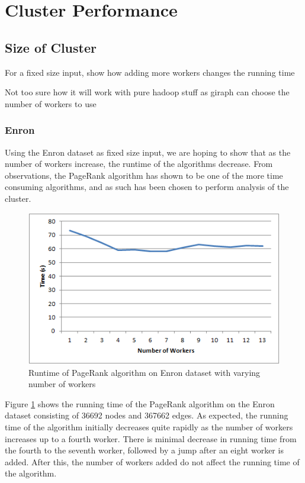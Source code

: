 \section{Cluster Performance}


\subsection{Size of Cluster}
For a fixed size input, show how adding more workers changes the running time

Not too sure how it will work with pure hadoop stuff as giraph can choose the number of workers to use

\subsubsection{Enron}
Using the Enron dataset as fixed size input, we are hoping to show that as the number of workers increase, the runtime of the algorithms decrease. From observations, the PageRank algorithm has shown to be one of the more time consuming algorithms, and as such has been chosen to perform analysis of the cluster.

\begin{figure}[htbp]%
\centering
\includegraphics[]{./img/pagerank-enron-benchmark}%
\caption{Runtime of PageRank algorithm on Enron dataset with varying number of workers}%
\label{fig:enronbenchmark}%
\end{figure}

Figure \ref{fig:enronbenchmark} shows the running time of the PageRank algorithm on the Enron dataset consisting of 36692 nodes and 367662 edges. As expected, the running time of the algorithm initially decreases quite rapidly as the number of workers increases up to a fourth worker. There is minimal decrease in running time from the fourth to the seventh worker, followed by a jump after an eight worker is added. After this, the number of workers added do not affect the running time of the algorithm.

